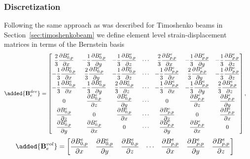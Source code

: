 \documentclass{article}
\begin{document}
\subsubsection{Discretization}
Following the same approach as was described for Timoshenko beams in Section~\ref{sec:timoshenkobeam} we define element level strain-displacement matrices in terms of the Bernstein basis 
\begin{align}
\added{\mathbf{B}^{dev}_e}&=
\begin{bmatrix}
\dfrac{2}{3}\dfrac{\partial{B}^e_{0,p}}{\partial{x}} & -\dfrac{1}{3}\dfrac{\partial{B}^e_{0,p}}{\partial{y}} & -\dfrac{1}{3}\dfrac{\partial{B}^e_{0,p}}{\partial{z}} & \cdots & \dfrac{2}{3}\dfrac{\partial{B}^e_{p,p}}{\partial{x}} & -\dfrac{1}{3}\dfrac{\partial{B}^e_{p,p}}{\partial{y}} & -\dfrac{1}{3}\dfrac{\partial{B}^e_{p,p}}{\partial{z}} \\
-\dfrac{1}{3}\dfrac{\partial{B}^e_{0,p}}{\partial{x}}  & \dfrac{2}{3}\dfrac{\partial{B}^e_{0,p}}{\partial{y}} & -\dfrac{1}{3}\dfrac{\partial{B}^e_{0,p}}{\partial{z}} & \cdots & -\dfrac{1}{3}\dfrac{\partial{B}^e_{p,p}}{\partial{x}}  & \dfrac{2}{3}\dfrac{\partial{B}^e_{p,p}}{\partial{y}} & -\dfrac{1}{3}\dfrac{\partial{B}^e_{p,p}}{\partial{z}}\\
-\dfrac{1}{3}\dfrac{\partial{B}^e_{0,p}}{\partial{x}} & -\dfrac{1}{3}\dfrac{\partial{B}^e_{0,p}}{\partial{y}} & \dfrac{2}{3}\dfrac{\partial{B}^e_{0,p}}{\partial{z}} & \cdots & -\dfrac{1}{3}\dfrac{\partial{B}^e_{p,p}}{\partial{x}} & -\dfrac{1}{3}\dfrac{\partial{B}^e_{p,p}}{\partial{y}} & \dfrac{2}{3}\dfrac{\partial{B}^e_{p,p}}{\partial{z}}\\
0 & \dfrac{\partial{B}^e_{0,p}}{\partial{z}} & \dfrac{\partial{B}^e_{0,p}}{\partial{y}} & \cdots & 0 & \dfrac{\partial{B}^e_{p,p}}{\partial{z}} & \dfrac{\partial{B}^e_{p,p}}{\partial{y}}\\
\dfrac{\partial{B}^e_{0,p}}{\partial{z}} & 0 & \dfrac{\partial{B}^e_{0,p}}{\partial{x}} & \cdots & \dfrac{\partial{B}^e_{p,p}}{\partial{z}} & 0 & \dfrac{\partial{B}^e_{p,p}}{\partial{x}}\\
\dfrac{\partial{B}^e_{0,p}}{\partial{y}} & \dfrac{\partial{B}^e_{0,p}}{\partial{x}} & 0 & \cdots & \dfrac{\partial{B}^e_{p,p}}{\partial{y}} & \dfrac{\partial{B}^e_{p,p}}{\partial{x}} & 0\\
\end{bmatrix},
\end{align}
\begin{align}
\added{\mathbf{B}_e^{vol}}&=
\begin{bmatrix}
\dfrac{\partial{B}^e_{0,p}}{\partial{x}} & \dfrac{\partial{B}^e_{0,p}}{\partial{y}} & \dfrac{\partial{B}^e_{0,p}}{\partial{z}} & \cdots & \dfrac{\partial{B}^e_{p,p}}{\partial{x}} & \dfrac{\partial{B}^e_{p,p}}{\partial{y}} & \dfrac{\partial{B}^e_{p,p}}{\partial{z}}
\end{bmatrix}
\end{align}
\end{document}
